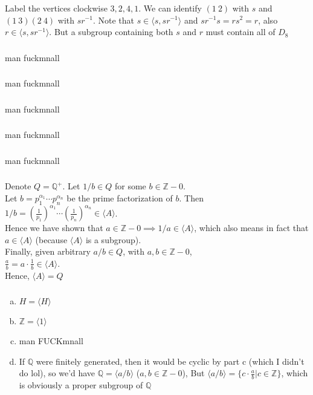 \documentclass{article}
\newcommand{\ints}{\mathbb{Z}}
\newcommand{\rats}{\mathbb{Q}}
\newcommand{\set}[1]{ \{ #1 \} }
\newcommand{\inv}[1]{ {#1}^{-1} }
\newcommand{\cyclic}[1]{\langle#1\rangle}
\begin{document}
\subsubsection{}\label{ex4p7}
Label the vertices clockwise $3,2,4,1$. We can identify $(1\ 2)$ with $s$ and $(1\ 3)(2\ 4)$ with $s\inv{r}$. Note that $s \in \cyclic{s,s\inv{r}}$ and $s\inv{r}s = rs^2 = r$, also $r\in \cyclic{s,s\inv{r}}$. But a subgroup containing both $s$ and $r$ must contain all of $D_8$
\subsubsection{}\label{ex4p8}
man fuckmnall
\subsubsection{}\label{ex4p9}
man fuckmnall
\subsubsection{}\label{ex4p10}
man fuckmnall
\subsubsection{}\label{ex4p11}
man fuckmnall
\subsubsection{}\label{ex4p12}
man fuckmnall
\subsubsection{}\label{ex4p13}
Denote $Q = \rats^+$. Let $1/b \in Q$ for some $b\in\ints-0$.\\
Let $b=p_1^{\alpha_1}\cdots p_n^{\alpha_n}$ be the prime factorization of $b$. Then $1/b = (\frac{1}{p_1})^{\alpha_1}\cdots(\frac{1}{p_n})^{\alpha_n} \in \cyclic{A}$.\\
Hence we have shown that $a\in \ints-0 \implies 1/a\in\cyclic{A}$, which also means in fact that $a \in \cyclic{A}$ (because $\cyclic{A}$ is a subgroup).\\
Finally, given arbitrary $a/b \in Q$, with $a,b\in\ints-0$,\\
$\frac{a}{b} = a\cdot\frac{1}{b}\in\cyclic{A}$.\\
Hence, $\cyclic{A} = Q$
\subsubsection{}\label{ex4p14}
\begin{enumerate}[(a)]
\item $H=\cyclic{H}$
\item $\ints = \cyclic{1}$
\item man FUCKmnall
\item If $\rats$ were finitely generated, then it would be cyclic by part c (which I didn't do lol), so we'd have $\rats=\cyclic{a/b}$ ($a,b\in \ints-0$), But $\cyclic{a/b} = \set{c\cdot\frac{a}{b} | c\in \ints}$, which is obviously a proper subgroup of $\rats$
\end{enumerate}
\end{document}
